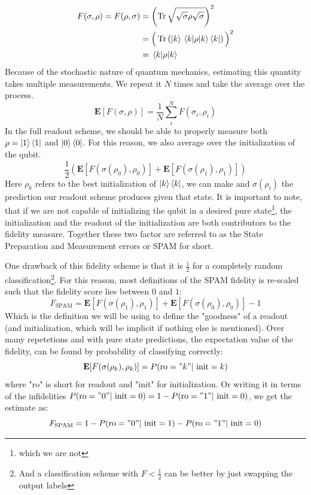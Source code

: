 \begin{align*}
    F(\sigma, \rho) = F(\rho, \sigma) &= \left(\Tr\sqrt{\sqrt{\sigma} \rho \sqrt{\sigma}}\right)^2 \\
    &= \Big(\Tr \left(\ket{k}\mel{k}{\rho}{k}\bra{k}\right)\Big)^2\\
    &= \mel{k}{\rho}{k}
\end{align*}
Because of the stochastic nature of quantum mechanics, estimating this quantity takes multiple measurements. We repeat it $N$ times and take the average over the process.  
\begin{equation}
    \mathbf{E}\left[F(\sigma, \rho)\right] = \frac{1}{N}\sum_i^N F(\sigma_i, \rho_i)
\end{equation}
In the full readout scheme, we should be able to properly measure both $\rho = \ket{1}\bra{1}$ and $\ket{0}\bra{0}$. For this reason, we also average over the initialization of the qubit. 
\begin{equation}
     \frac12 \left(\mathbf{E}\left[F(\sigma(\rho_0), \rho_0)\right] +  \mathbf{E}\left[F(\sigma(\rho_1), \rho_1)\right]\right)
\end{equation}
Here $\rho_k$ refers to the best initialization of $\ket{k}\bra{k}$, we can make and $\sigma(\rho_i)$ the prediction our readout scheme produces given that state. It is important to note, that if we are not capable of initializing the qubit in a desired pure state\footnote{which we are not}, the initialization and the readout of the initialization are both contributors to the fidelity measure. Together these two factor are referred to as the State Preparation and Measurement errors or SPAM for short.

One drawback of this fidelity scheme is that it is $\frac12$ for a completely random classification\footnote{And a classification scheme with $F<\frac12$ can be better by just swapping the output labels}. For this reason, most definitions of the SPAM fidelity \cite{gambetta_protocols_2007, blais_circuit_2021} is re-scaled such that the fidelity score lies between $0$ and $1$:
\begin{equation}
    F_{\text{SPAM}} = \mathbf{E}[F(\sigma(\rho_1), \rho_1)] + \mathbf{E}[F(\sigma(\rho_0), \rho_0)] - 1
\end{equation}
Which is the definition we will be using to define the "goodness" of a readout (and initialization, which will be implicit if nothing else is mentioned). Over many repetetions and with pure state predictions, the expectation value of the fidelity, can be found by probability of classifying correctly:
\begin{equation}
     \mathbf{E}[F(\sigma(\rho_k), \rho_k)] = P(\text{ro} = "k"| \text{ init} = k)
\end{equation}
where "ro" is short for readout and "init" for initialization. Or writing it in terms of the infidelities $ P(\text{ro} = "0"| \text{ init} = 0) = 1 - P(\text{ro} = "1"| \text{ init} = 0)$, we get the estimate as:
\begin{equation}\label{eq:fidelity_spam_estimate}
    F_{\text{SPAM}} = 1 - P(\text{ro} = "0"| \text{ init} = 1) - P(\text{ro} = "1"| \text{ init} = 0)  
\end{equation}

